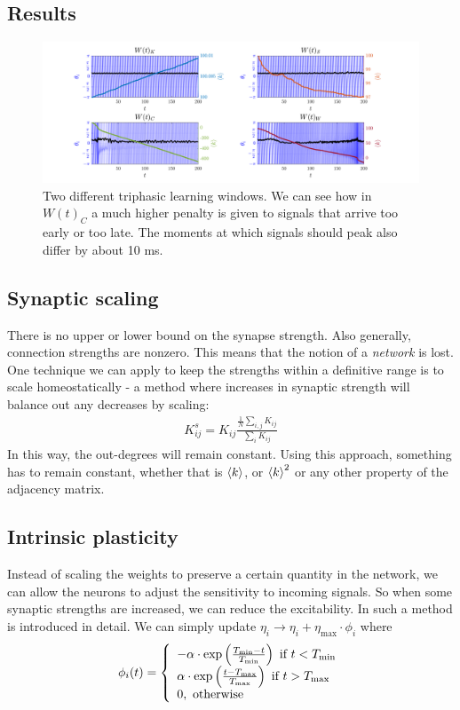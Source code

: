 \subsection{Results}
\begin{figure}[H]
\centering
\includegraphics[width = \textwidth, trim={60 0 60 0}]{../Figures/LearningWithoutScaling.png}
\caption{Two different triphasic learning windows. We can see how in $W(t)_C$  a much higher penalty is given to signals that arrive too early or too late. The moments at which signals should peak also differ by about 10 ms.}
\label{fig:LearningWithoutScaling}
\end{figure}


\subsection{Synaptic scaling}
There is no upper or lower bound on the synapse strength. Also generally, connection strengths are nonzero. This means that the notion of a \textsl{network} is lost.\\
One technique we can apply to keep the strengths within a definitive range is to scale homeostatically - a method where increases in synaptic strength will balance out any decreases by scaling:
\begin{align}
K_{ij}^s = K_{ij} \frac{\frac{1}{N} \sum_{i,j} K_{ij}}{\sum_{i} K_{ij}}
\end{align}
In this way, the out-degrees will remain constant. Using this approach, something has to remain constant, whether that is ${\langle k\rangle}$, or ${\langle k\rangle}^2$ or any other property of the adjacency matrix.


\subsection{Intrinsic plasticity}
Instead of scaling the weights to preserve a certain quantity in the network, we can allow the neurons to adjust the sensitivity to incoming signals. So when some synaptic strengths are increased, we can reduce the excitability. In \cite{Song2017} such a method is introduced in detail. We can simply update $\eta_{i} \rightarrow \eta_{i} + \eta_{\max } \cdot \phi_{i}$ where 
\begin{align}
\phi_{i} (t) =\left\{\begin{array}{l}-\alpha \cdot \exp \left(\frac{T_{\min }-t}{T_{\rm min }}\right) \text { if } t<T_{ \rm min } \\ \alpha \cdot \exp \left(\frac{t-T_{\rm max }}{T_{\max }}\right) \text { if } t >T_{\rm max } \\ 0, \text { otherwise }\end{array}\right.
\end{align}

